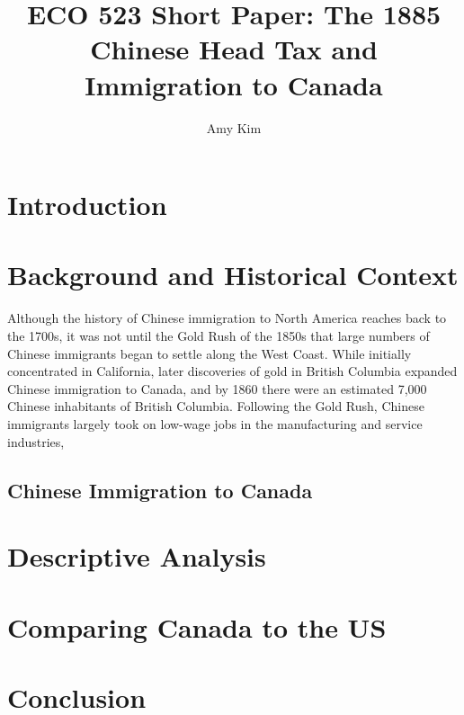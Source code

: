 \documentclass[12pt]{article}
\title{ECO 523 Short Paper: The 1885 Chinese Head Tax and Immigration to Canada}
\author{Amy Kim}
\begin{document}
\maketitle

\section{Introduction}

\section{Background and Historical Context}
Although the history of Chinese immigration to North America reaches back to the 1700s, it was not until the Gold Rush of the 1850s that large numbers of Chinese immigrants began to settle along the West Coast. 
While initially concentrated in California, later discoveries of gold in British Columbia expanded Chinese immigration to Canada, and by 1860 there were an estimated 7,000 Chinese inhabitants of British Columbia.
Following the Gold Rush, Chinese immigrants largely took on low-wage jobs in the manufacturing and service industries, 

\subsection{Chinese Immigration to Canada}

\section{Descriptive Analysis}

\section{Comparing Canada to the US}

\section{Conclusion}

\newpage


\end{document}
